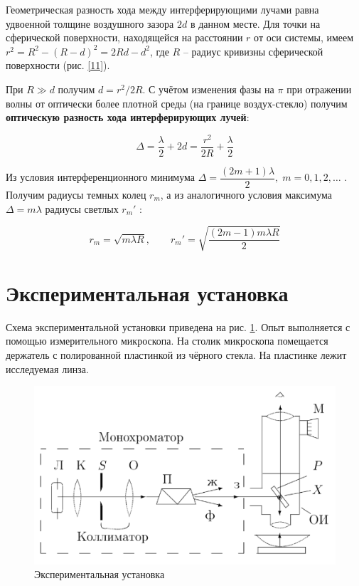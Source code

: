\documentclass[a4paper, 12pt]{article}%
\begin{document}
	Геометрическая разность хода между интерферирующими лучами равна удвоенной толщине воздушного зазора $ 2d $ в данном месте. Для точки на сферической поверхности, находящейся на расстоянии $ r $ от оси системы, имеем $ r^2 = R^2 - (R - d)^2 = 2Rd - d^2 $, где $ R $ -- радиус кривизны сферической поверхности (рис. \ref{11}).
	
	При $ R \gg d $ получим $d = r^2/2R $. С учётом изменения фазы на $ \pi $ при отражении волны от оптически более плотной среды (на границе воздух-стекло) получим \textbf{оптическую разность хода интерферирующих лучей}:
	
	\begin{equation}\label{r_m}
	\Delta = \dfrac{\lambda}{2} + 2d = \dfrac{r^2}{2R} + \dfrac{\lambda}{2}
	\end{equation}
	
	Из условия интерференционного минимума $ \Delta = \dfrac{(2m +1)\lambda}{2}, \; m =0, 1, 2, \dots $ . Получим радиусы темных колец $ r_m $, а из аналогичного условия максимума $ \Delta = m \lambda $ радиусы светлых $ r_m' $ :
	
	\begin{equation}\label{r_m'}
	r_m = \sqrt{m \lambda R}, \qquad 	r_m' = \sqrt{\dfrac{(2m-1)m \lambda R}{2}}
	\end{equation}


\section{Экспериментальная установка}

Схема экспериментальной установки приведена на рис. \ref{2}. Опыт выполняется с помощью измерительного микроскопа.
На столик микроскопа помещается держатель с полированной пластинкой из
чёрного стекла. На пластинке лежит исследуемая линза.

	\begin{figure}[!h]
	\includegraphics[width=\linewidth]{2.png}
	\caption{Экспериментальная установка}
	\label{2}
	\end{figure}
\end{document}
